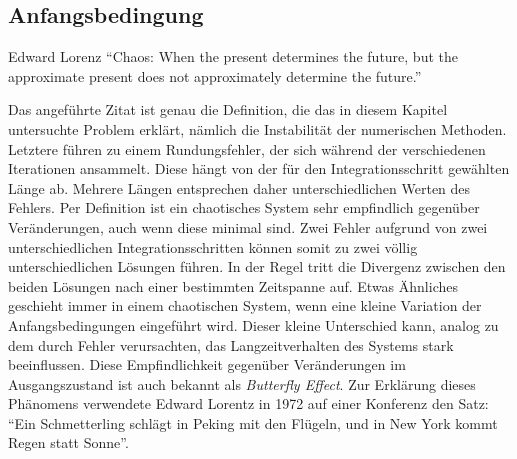 \subsection{Anfangsbedingung}
\label{vanderpol:subsection:anfangsbedingung}
\begin{cquote}[30pt]{Edward Lorenz}
``Chaos: When the present determines the future, but the approximate present does not approximately determine the future.''\cite{vanderpol:biblorenz}
\end{cquote}
%
\noindent Das angeführte Zitat ist genau die Definition, die das in diesem Kapitel untersuchte Problem erklärt, nämlich die Instabilität der numerischen Methoden. Letztere führen zu einem Rundungsfehler, der sich während der verschiedenen Iterationen ansammelt. Diese hängt von der für den Integrationsschritt gewählten Länge ab. Mehrere Längen entsprechen daher unterschiedlichen Werten des Fehlers.
Per Definition ist ein chaotisches System sehr empfindlich gegenüber Veränderungen, auch wenn diese minimal sind. Zwei Fehler aufgrund von zwei unterschiedlichen Integrationsschritten können somit zu zwei völlig unterschiedlichen Lösungen führen. In der Regel tritt die Divergenz zwischen den beiden Lösungen nach einer bestimmten Zeitspanne auf. Etwas Ähnliches geschieht immer in einem chaotischen System, wenn eine kleine Variation der Anfangsbedingungen eingeführt wird. Dieser kleine Unterschied kann, analog zu dem durch Fehler verursachten, das Langzeitverhalten des Systems stark beeinflussen. Diese Empfindlichkeit gegenüber Veränderungen im Ausgangszustand ist auch bekannt als {\em Butterfly Effect}. Zur Erklärung dieses Phänomens verwendete Edward Lorentz in 1972 auf einer Konferenz den Satz: ``Ein Schmetterling schlägt in Peking mit den Flügeln, und in New York kommt Regen statt Sonne''.
%
